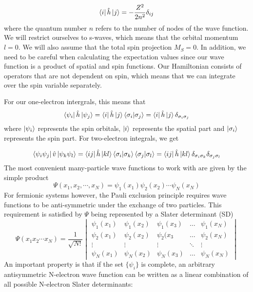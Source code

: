 \documentclass[a4paper,12pt]{article}
\begin{document}
\begin{equation}
\label{eq:singleparticleEnergies}
\bra{i} \hat{h} \ket{j} = -\frac{Z^2}{2n^2} \delta_{ij}
\end{equation}
where the quantum number $n$ refers to the number of nodes of the wave function. We will restrict ourselves to s-waves, which means that the orbital momentum $l=0$. We will also assume that the total spin projection $M_S = 0$.
In addition, we need to be careful when calculating the expectation values since our wave function is a product of spatial and spin functions. Our Hamiltonian consists of operators that are not dependent on spin, which means that we can integrate over the spin variable separately.

\bigskip
For our one-electron intergrals, this means that
\begin{equation}
\label{eq:spinorthooneelec}
	\bra{\psi_i}\hat{h} \ket{\psi_j} = \bra{i} \hat{h} \ket{j} \bra{\sigma_i}\ket{\sigma_j} = \bra{i} \hat{h} \ket{j} \delta_{\sigma_i \sigma_j}
\end{equation}
where $\ket{\psi_i}$ represents the spin orbitals, $\ket{i}$ represents the spatial part and $\ket{\sigma_i}$ represents the spin part.
\bigskip
For two-electron integrals, we get

\begin{equation}
\label{eq:spinorthotwoelec}
	\bra{\psi_i \psi_j} \hat{v} \ket{\psi_k \psi_l} = \bra{ij} \hat{h} \ket{kl} \bra{\sigma_i}\ket{\sigma_k}\bra{\sigma_j}\ket{\sigma_l} = \bra{ij} \hat{h} \ket{kl} \delta_{\sigma_i \sigma_k} \delta_{\sigma_j \sigma_l}
\end{equation}
\bigskip
The most convenient many-particle wave functions to work with are given by the simple product
$$\Psi(x_1, x_2, \cdots ,x_N)  = \psi_1(x_1)\psi_2(x_2) \cdots \psi_N(x_N)$$
For fermionic systems however, the Pauli exclusion principle requires wave functions to be anti-symmetric under the exchange of two particles. This requirement is satisfied by $\Psi$ being represented by a Slater determinant (SD)
\begin{equation}
\label{eq:SD}
	\Psi(x_1 x_2 \cdots x_N) = \frac{1}{\sqrt{N!}}\begin{vmatrix}
	\psi_1(x_1) & \psi_1(x_2) &\psi_1(x_3) & \dots & \psi_1(x_N) \\ 
	\psi_2(x_1) & \psi_2(x_2) & \psi_2(x_3 & \dots & \psi_2(x_N) \\
	\vdots & \vdots & \vdots & \ddots & \vdots \\
	\psi_N(x_1) & \psi_N(x_2) & \psi_N(x_3) & \dots & \psi_N(x_N)
	\end{vmatrix}
\end{equation}
An important property is that if the set $\{\psi_i\}$ is complete, an arbitrary antisymmetric N-electron wave function can be written as a linear combination of all possible N-electron Slater determinants:
\end{document}
